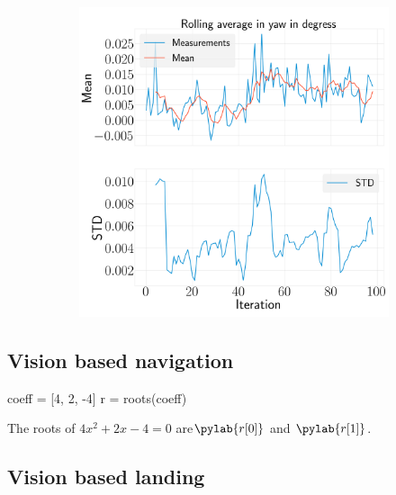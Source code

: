 \documentclass[../Head/report.tex]{subfiles}
\begin{document}
\begin{figure}[H]
\begin{subfigure}[t]{.30\textwidth}
        \caption{}
        \label{fig:GPS2Vision_pose_estimation_test2_roll}
    \end{subfigure}
     \hspace{0.2em}
    \begin{subfigure}[t]{.30\textwidth}
        \centering
        \includegraphics[width=\textwidth]{../Figures/analyse_rolling_average/test2/Calculated_rolling_average_in_yaw_with_mean_and_STD.png}
        \caption{}
        \label{fig:GPS2Vision_pose_estimation_test2_roll}
    \end{subfigure}
    \caption{}
    \label{fig:GPS2Vision_pose_estimation_test2_error_ori}
\end{figure}

\subsection{Vision based navigation}

\begin{pylabcode}
coeff = [4, 2, -4]
r = roots(coeff)
\end{pylabcode}

The roots of $4x^2 + 2x - 4 = 0$ are$\pylab{r[0]}$ and $\pylab{r[1]}$.

\subsection{Vision based landing}
\end{document}
